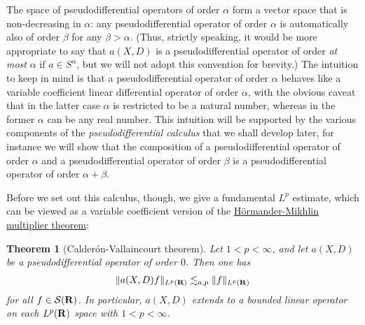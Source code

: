 \documentclass[11pt]{article}
\newtheorem{theorem}{Theorem}
\theoremstyle{definition}
\begin{document}
The space of pseudodifferential operators of order \({\alpha}\) form a vector space that is non-decreasing in \({\alpha}\): any pseudodifferential operator of order \({\alpha}\) is automatically also of order \({\beta}\) for any \({\beta>\alpha}\). (Thus, strictly speaking, it would be more appropriate to say that \({a(X,D)}\) is a pseudodifferential operator of order \emph{at most} \({\alpha}\) if \({a \in S^\alpha}\), but we will not adopt this convention for brevity.) The intuition to keep in mind is that a pseudodifferential operator of order \({\alpha}\) behaves like a variable coefficient linear differential operator of order \({\alpha}\), with the obvious caveat that in the latter case \({\alpha}\) is restricted to be a natural number, whereas in the former \({\alpha}\) can be any real number. This intuition will be supported by the various components of the \emph{pseudodifferential calculus} that we shall develop later, for instance we will show that the composition of a pseudodifferential operator of order \({\alpha}\) and a pseudodifferential operator of order \({\beta}\) is a pseudodifferential operator of order \({\alpha+\beta}\).


Before we set out this calculus, though, we give a fundamental \({L^p}\) estimate, which can be viewed as a variable coefficient version of the \href{https://en.wikipedia.org/wiki/Multiplier_(Fourier_analysis)#Mikhlin_multiplier_theorem}{Hörmander-Mikhlin multiplier theorem}:

\begin{theorem}[Calderón-Vallaincourt theorem]
 \label{cv} Let \({1 < p < \infty}\), and let \({a(X,D)}\) be a pseudodifferential operator of order \({0}\). Then one has 
\begin{align}\label{clp}
  \| a(X,D) f\|_{L^p({\bf R})} \lesssim_{a,p} \|f\|_{L^p({\bf R})} 
\end{align}
 for all \({f \in {\mathcal S}({\bf R})}\). In particular, \({a(X,D)}\) extends to a bounded linear operator on each \({L^p({\bf R})}\) space with \({1 < p < \infty}\). 
\end{theorem}
\end{document}
